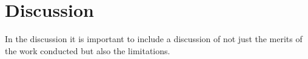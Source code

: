 
\section{Discussion}
\label{section:Discussion:Discussion}

In the discussion it is important to include a discussion of not just the merits of the work conducted but also the limitations. 

